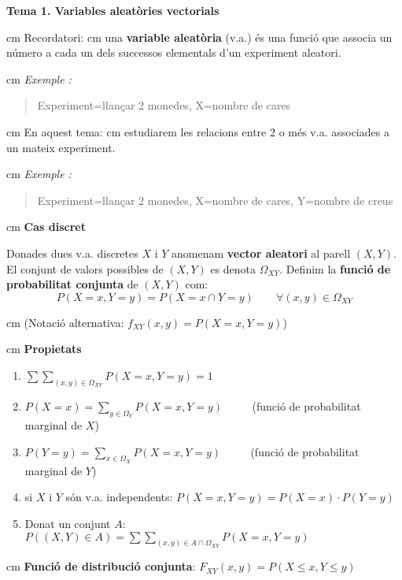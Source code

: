 \documentclass{article}
\newcounter{exctr}
\newenvironment{exemple}
{ \stepcounter{exctr} 
\hspace{0.2cm} 
\textit{Exemple  \arabic{exctr}: }
\it
\begin{quotation}
}{\end{quotation}}
\begin{document}
\textbf{\Large Tema 1. Variables aleat\`ories vectorials}

 cm
\noindent
Recordatori:
 cm
una \textbf{variable aleat\`oria} (v.a.) \'es una funci\'o
que associa un n\'umero a cada un dels successos elementals d'un experiment 
aleatori.

 cm
\begin{exemple}
Experiment=llan\c{c}ar 2 monedes, X=nombre de cares
\end{exemple}

 cm
\noindent
En aquest tema:
 cm
estudiarem les relacions entre 2 o m\'es v.a. associades a un mateix experiment.


 cm
\begin{exemple}
Experiment=llan\c{c}ar 2 monedes, X=nombre de cares, Y=nombre de creus
\end{exemple}


 cm
\noindent
\textbf{\large Cas discret}

\noindent
Donades dues v.a. discretes $X$ i $Y$ anomenam \textbf{vector aleatori} al parell $(X, Y)$.
El conjunt de valors possibles de $(X, Y)$ es denota $\Omega_{XY}$. 
Definim la \textbf{funci\'o de probabilitat conjunta} de $(X, Y)$ com:
\[
P(X=x, Y=y)=P(X=x \cap Y=y) \qquad \forall (x, y) \in \Omega_{XY}
\]

 cm
(Notaci\'o alternativa: $f_{XY}(x, y)=P(X=x, Y=y)$)

 cm
\textbf{Propietats}
\begin{enumerate}
\item $\sum\sum_{(x, y) \in \Omega_{XY}} P(X=x, Y=y) = 1$
\item $P(X=x)=\sum_{y \in \Omega_Y} P(X=x, Y=y)$ $\qquad$ (funci\'o de probabilitat marginal de $X$)
\item $P(Y=y)=\sum_{x \in \Omega_X} P(X=x, Y=y)$ $\qquad$ (funci\'o de probabilitat marginal de $Y$)
\item si $X$ i $Y$ s\'on v.a. independents: $P(X=x, Y=y)=P(X=x) \cdot P(Y=y)$
\item Donat un conjunt $A$: $P((X, Y) \in A) = \sum\sum_{(x, y) \in A \cap \Omega_{XY}} P(X=x, Y=y)$
\end{enumerate}

 cm
\noindent
\textbf{Funci\'o de distribuci\'o conjunta}: $F_{XY}(x, y)=P(X \leq x, Y \leq y)$
\end{document}
